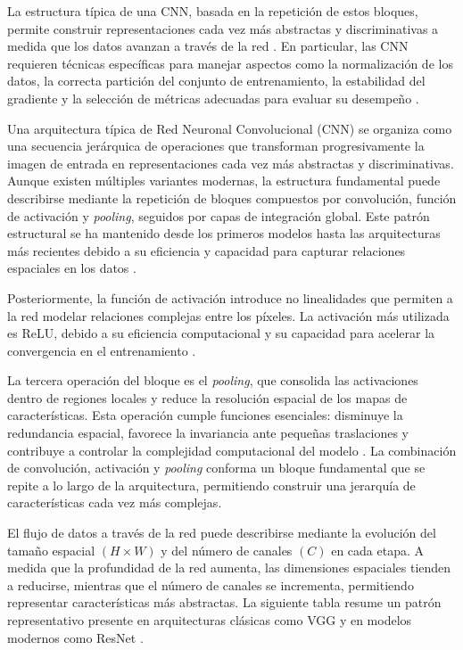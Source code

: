 	La estructura típica de una CNN, basada en la repetición de estos bloques, permite construir representaciones cada vez más abstractas y discriminativas a medida que los datos avanzan a través de la red \cite{simonyan2014}. En particular, las CNN requieren técnicas específicas para manejar aspectos como la normalización de los datos, la correcta partición del conjunto de entrenamiento, la estabilidad del gradiente y la selección de métricas adecuadas para evaluar su desempeño \cite{iofffe2015}.
	
	Una arquitectura típica de Red Neuronal Convolucional (CNN) se organiza como una secuencia jerárquica de operaciones que transforman progresivamente la imagen de entrada en representaciones cada vez más abstractas y discriminativas. Aunque existen múltiples variantes modernas, la estructura fundamental puede describirse mediante la repetición de bloques compuestos por convolución, función de activación y \textit{pooling}, seguidos por capas de integración global. Este patrón estructural se ha mantenido desde los primeros modelos hasta las arquitecturas más recientes debido a su eficiencia y capacidad para capturar relaciones espaciales en los datos \cite{simonyan2014}.
	
	Posteriormente, la función de activación introduce no linealidades que permiten a la red modelar relaciones complejas entre los píxeles. La activación más utilizada es ReLU, debido a su eficiencia computacional y su capacidad para acelerar la convergencia en el entrenamiento \cite{goodfellow2016dl}.
	
	La tercera operación del bloque es el \textit{pooling}, que consolida las activaciones dentro de regiones locales y reduce la resolución espacial de los mapas de características. Esta operación cumple funciones esenciales: disminuye la redundancia espacial, favorece la invariancia ante pequeñas traslaciones y contribuye a controlar la complejidad computacional del modelo \cite{scherer2010}. La combinación de convolución, activación y \textit{pooling} conforma un bloque fundamental que se repite a lo largo de la arquitectura, permitiendo construir una jerarquía de características cada vez más complejas.
	
	El flujo de datos a través de la red puede describirse mediante la evolución del tamaño espacial $(H \times W)$ y del número de canales $(C)$ en cada etapa. A medida que la profundidad de la red aumenta, las dimensiones espaciales tienden a reducirse, mientras que el número de canales se incrementa, permitiendo representar características más abstractas. La siguiente tabla resume un patrón representativo presente en arquitecturas clásicas como VGG y en modelos modernos como ResNet \cite{iandola2016squeezenet}.
	
